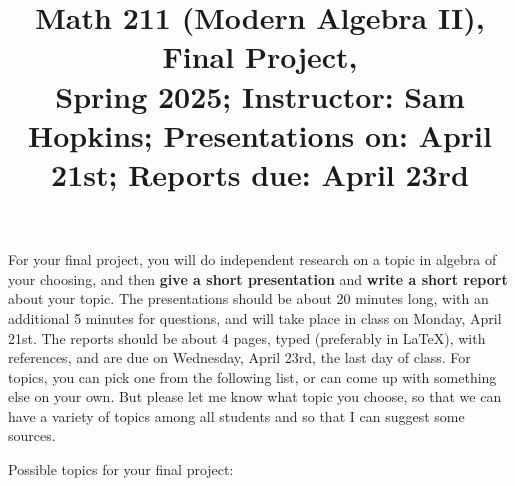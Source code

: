\documentclass[11pt]{article}
\title{Math 211 (Modern Algebra II), Final Project, \\ {\normalsize Spring 2025; Instructor: Sam Hopkins; Presentations on: April 21st; Reports due: April 23rd}}
\date{}
\begin{document}
\maketitle

\thispagestyle{empty}

\vspace{-1.5cm}

For your final project, you will do independent research on a topic in algebra of your choosing, and then {\bf give a short presentation} and {\bf write a short report} about your topic. The presentations should be about 20 minutes long, with an additional 5 minutes for questions, and will take place in class on Monday, April 21st. The reports should be about 4 pages, typed (preferably in LaTeX), with references, and are due on Wednesday, April 23rd, the last day of class. For topics, you can pick one from the following list, or can come up with something else on your own. But please let me know what topic you choose, so that we can have a variety of topics among all students and so that I can suggest some sources.

Possible topics for your final project:

\vspace{-0.2cm}
\end{document}
